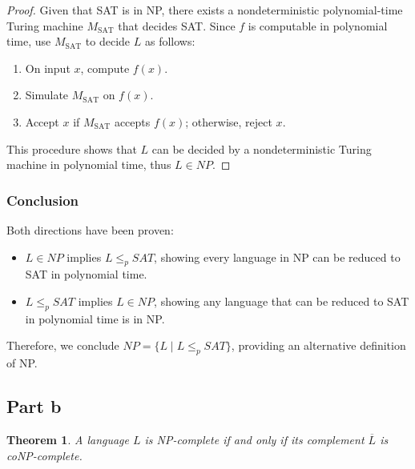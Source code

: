 \documentclass[a4paper,10pt]{article}
\newtheorem{theorem}{Theorem}
\begin{document}
\begin{proof}
Given that SAT is in NP, there exists a nondeterministic polynomial-time Turing machine \( M_{\text{SAT}} \) that decides SAT. Since \( f \) is computable in polynomial time, use \( M_{\text{SAT}} \) to decide \( L \) as follows:

\begin{enumerate}
    \item On input \( x \), compute \( f(x) \).
    \item Simulate \( M_{\text{SAT}} \) on \( f(x) \).
    \item Accept \( x \) if \( M_{\text{SAT}} \) accepts \( f(x) \); otherwise, reject \( x \).
\end{enumerate}

This procedure shows that \( L \) can be decided by a nondeterministic Turing machine in polynomial time, thus \( L \in NP \).
\end{proof}
\subsubsection*{Conclusion}
Both directions have been proven:
\begin{itemize}
    \item \( L \in NP \) implies \( L \leq_p SAT \), showing every language in NP can be reduced to SAT in polynomial time.
    \item \( L \leq_p SAT \) implies \( L \in NP \), showing any language that can be reduced to SAT in polynomial time is in NP.
\end{itemize}

Therefore, we conclude \( NP = \{ L \mid L \leq_p SAT \} \), providing an alternative definition of NP.

\subsection{Part b}


\begin{theorem}
A language \( L \) is NP-complete if and only if its complement \( \overline{L} \) is coNP-complete.
\end{theorem}
\end{document}

